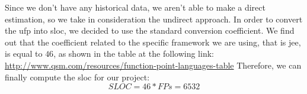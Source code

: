 Since we don't have any historical data, we aren't able to make a direct estimation, so we take in consideration the undirect approach.
In order to convert the \acs{ufp} into \acs{sloc}, we decided to use the standard conversion coefficient. We find out that the coefficient related to the specific framework we are using, that is \acs{jee}, is equal to $46$, as shown in the table at the following link: \url{http://www.qsm.com/resources/function-point-languages-table}
Therefore, we can finally compute the \acs{sloc} for our project:
\[SLOC = 46 * FPs = 6532\]